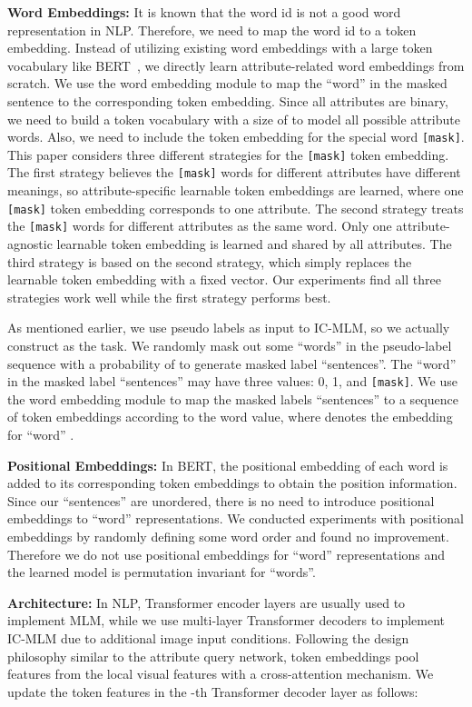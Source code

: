 \documentclass[runningheads]{llncs}
\begin{document}
\textbf{Word Embeddings:}
It is known that the word id is not a good word representation in NLP. Therefore, we need to map the word id to a token embedding. Instead of utilizing existing word embeddings with a large token vocabulary like BERT~\cite{devlin2018bert}, we directly learn attribute-related word embeddings  from
scratch. We use the word embedding module to map the ``word'' in the masked sentence to the corresponding token embedding. Since all attributes are binary, we need to build a token vocabulary with a size of  to model all possible attribute words. Also, we need to include the token embedding for the special word \texttt{[mask]}. This paper considers three different strategies for the \texttt{[mask]} token embedding. The first strategy believes the \texttt{[mask]} words for different attributes have different meanings, so  attribute-specific learnable token embeddings are learned, where one \texttt{[mask]} token embedding corresponds to one attribute. The second strategy treats the \texttt{[mask]} words for different attributes as the same word. Only one attribute-agnostic learnable token embedding is learned and shared by all attributes. The third strategy is based on the second strategy, which simply replaces the learnable token embedding with a fixed  vector. Our experiments find all three strategies work well while the first strategy performs best.

As mentioned earlier, we use pseudo labels  as input to IC-MLM, so we actually construct  as the task. We randomly mask out some ``words'' in the pseudo-label sequence with a probability of  to generate masked label ``sentences''. The ``word''  in the masked label ``sentences'' may have three values: 0, 1, and \texttt{[mask]}.
We use the word embedding module to map the masked labels ``sentences'' to a sequence of token embeddings  according to the word value,
where  denotes the embedding for ``word'' .

\textbf{Positional Embeddings:} In BERT, the positional embedding of each word is added to its corresponding token embeddings to obtain the position information.
Since our ``sentences'' are unordered, there is no need to introduce positional embeddings to ``word'' representations. We conducted experiments with positional embeddings by randomly defining some word order and found no improvement. Therefore we do not use positional embeddings for ``word'' representations and the learned model is permutation invariant for ``words''.



\textbf{Architecture:} In NLP, Transformer encoder layers are usually used to implement MLM, while we use multi-layer Transformer decoders to implement IC-MLM due to additional image input conditions. Following the design philosophy similar to the attribute query network, token embeddings  pool features from the local visual features  with a cross-attention mechanism. We update the token features  in the -th Transformer decoder layer as follows:
\end{document}
